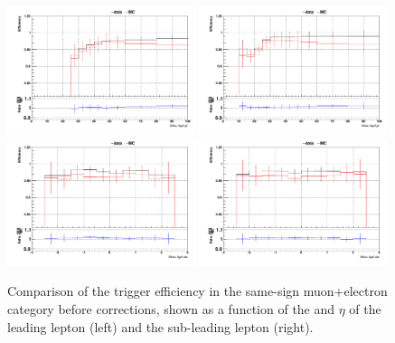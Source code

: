 \begin{figure}[htp]
\centering
\includegraphics[width=0.49\textwidth]{ch6_figs/1D_eff_lep1_pt_eu_ARCv2_change_3l_pt_ranges.pdf}
\includegraphics[width=0.49\textwidth]{ch6_figs/1D_eff_lep2_pt_eu_ARCv2_change_3l_pt_ranges.pdf} \\
\includegraphics[width=0.49\textwidth]{ch6_figs/1D_eff_lep1_eta_eu_ARCv2_change_3l_pt_ranges.pdf}
\includegraphics[width=0.49\textwidth]{ch6_figs/1D_eff_lep2_eta_eu_ARCv2_change_3l_pt_ranges.pdf}
\caption[Trigger efficiency in the 2lss $e\mu$ category]{Comparison of the trigger efficiency in the same-sign muon+electron category before 
corrections, shown as a function of the \pt and $\eta$ of the leading lepton (left) 
and the sub-leading lepton (right).}
\label{fig:trigeffsemu}
\end{figure}

